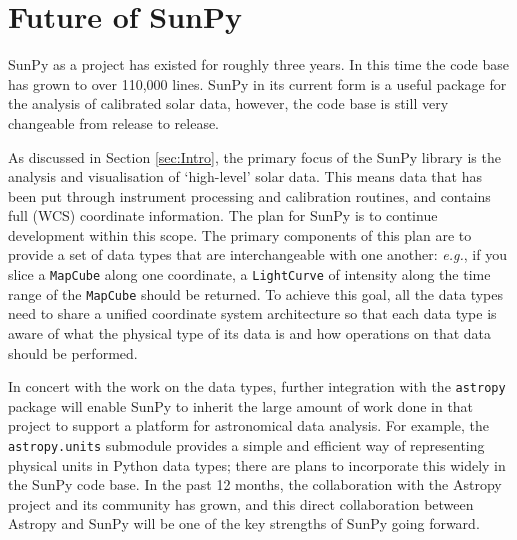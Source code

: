 \section{Future of SunPy}\label{sec:future}
SunPy as a project has existed for roughly three years. In this time 
the code 
base has grown to over 110,000 lines. SunPy in its current form is a 
useful 
package for the analysis of calibrated solar data, however, the code 
base is 
still very changeable from release to release.

As discussed in Section \ref{sec:Intro}, the primary focus of the 
SunPy library is the analysis and visualisation of `high-level' solar 
data. This means data that has been put through instrument processing 
and 
calibration routines, and contains full (WCS) coordinate information. 
The plan for SunPy is to continue development within this 
scope. The 
primary components of this plan are to provide a set of data types 
that are 
interchangeable with one another: \textit{e.g.}, if you slice a 
\texttt{MapCube} 
along one coordinate, a \texttt{LightCurve} of intensity along the 
time range of 
the \texttt{MapCube} should be returned. To achieve this goal, all the 
data 
types need to share a unified coordinate system architecture so that 
each data 
type is aware of what the physical type of its data is and how 
operations on 
that data should be performed.

In concert with the work on the data types, further integration with 
the 
\texttt{astropy} package will enable SunPy to inherit the large 
amount of work 
done in that project to support a platform for astronomical data 
analysis. For 
example, the \texttt{astropy.units} submodule provides a simple and 
efficient 
way of representing physical units in Python data types; there are 
plans to 
incorporate this widely in the SunPy code base. In the past 12 months, 
the 
collaboration with the Astropy project 
\citep{theastropycollaboration2013} and 
its community has grown, and this direct collaboration between Astropy 
and 
SunPy will be one of the key strengths of SunPy going forward.
